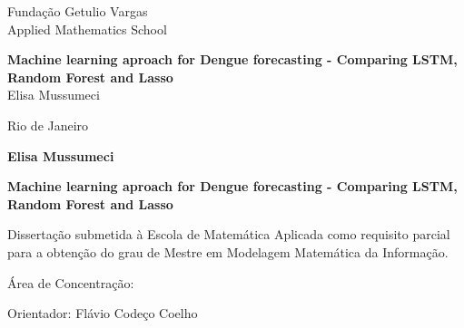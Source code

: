 \documentclass[12pt]{report}
\begin{document}
\begin{titlepage}
\begin{center}
{\LARGE Fundação Getulio Vargas}\\
\vspace{0.3cm}
{\LARGE Applied Mathematics School}\\
\vspace{0.3cm}

\par
\vspace{170pt}
  \textbf{\Large {Machine learning aproach for Dengue forecasting - Comparing LSTM, Random Forest and Lasso}}\\
  
\vspace{32pt}
{\Large Elisa Mussumeci}\\
\end{center}

\par
\vfill
\begin{center}
{{\normalsize Rio de Janeiro}\\
{\normalsize \the\year}}
\end{center}
\end{titlepage}

\thispagestyle{empty}

\newpage
\begin{center}
\textbf{\LARGE Elisa Mussumeci}

\par
\vspace{200pt}
\textbf{\Large Machine learning aproach for Dengue forecasting - Comparing LSTM, Random Forest and Lasso}
\end{center}

\par
\vspace{85pt}
\hspace*{175pt}\parbox{7.6cm}{{\normalsize Dissertação submetida à Escola de Matemática Aplicada como requisito parcial para a obtenção do grau de Mestre em Modelagem Matemática da Informação.}}

\par
\vspace{1em}
\hspace*{125pt}\parbox{10.0cm}{{\normalsize Área de Concentração: }}

\par
\vspace{1em}
\hspace*{125pt}\parbox{10.0cm}{{\normalsize Orientador: Flávio Codeço Coelho}}\\
\end{document}
